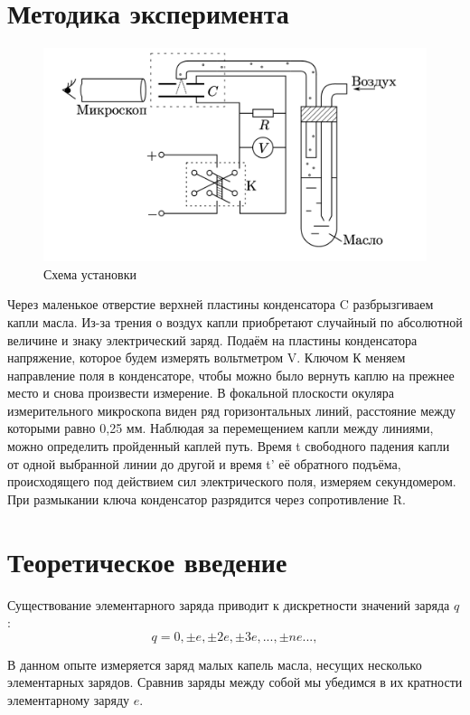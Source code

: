 \documentclass[a4paper,12pt]{article} %
\begin{document}
\section{Методика эксперимента}
\begin{figure}[h!]
    \centering
    \includegraphics[width=0.8\linewidth]{Снимок экрана 2024-12-24 в 19.44.51.png}
    \caption{Схема установки}
    \label{fig:enter-label}
\end{figure}
\noindent
Через маленькое отверстие верхней пластины конденсатора C разбрызгиваем капли масла. Из-за трения о воздух капли приобретают случайный по абсолютной величине и знаку электрический заряд. 
Подаём на пластины конденсатора напряжение, которое будем измерять вольтметром V. Ключом К меняем направление поля в конденсаторе, чтобы можно было вернуть каплю на прежнее место и снова произвести измерение. В фокальной плоскости окуляра измерительного микроскопа виден ряд горизонтальных линий, расстояние между которыми равно 0,25 мм. Наблюдая за перемещением капли между линиями, можно определить пройденный каплей путь. Время t свободного падения капли от одной выбранной линии до другой и время t' её обратного подъёма, происходящего под действием сил электрического поля, измеряем секундомером. При размыкании ключа конденсатор разрядится через сопротивление R. 
\newpage
\section{Теоретическое введение}
Существование элементарного заряда приводит к дискретности значений заряда $q$:
\begin{equation}
q = 0, \pm e, \pm 2e, \pm 3e, ..., \pm ne ..., 
\end{equation}

В данном опыте измеряется заряд малых капель масла, несущих несколько элементарных зарядов. Сравнив заряды между собой мы убедимся в их кратности элементарному заряду $e$.
\end{document}
